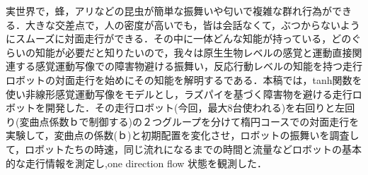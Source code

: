 実世界で，蜂，アリなどの昆虫が簡単な振舞いや匂いで複雑な群れ行為ができる．大きな交差点で，人の密度が高いでも，皆は会話なくて，ぶつからないようにスムーズに対面走行ができる．その中に一体どんな知能が持っている，どのぐらいの知能が必要だと知りたいので，我々は原生生物レベルの感覚と運動直接関連する感覚運動写像での障害物避ける振舞い，反応行動レベルの知能を持つ走行ロボットの対面走行を始めにその知能を解明するである．本稿では，tanh関数を使い非線形感覚運動写像をモデルとし，ラズパイを基づく障害物を避ける走行ロボットを開発した．その走行ロボット(今回，最大8台使われる)を右回りと左回り(変曲点係数ｂで制御する)の２つグループを分けて楕円コースでの対面走行を実験して，変曲点の係数(ｂ)と初期配置を変化させ，ロボットの振舞いを調査して，ロボットたちの時速，同じ流れになるまでの時間と流量などロボットの基本的な走行情報を測定し,one direction flow 状態を観測した．
